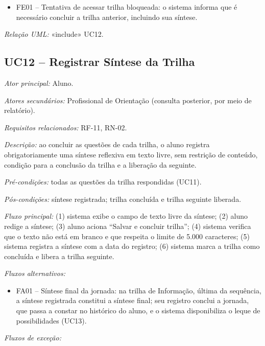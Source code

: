 \begin{itemize}[label={},leftmargin=\parindent,itemsep=0pt,topsep=0pt]
  \item FE01 – Tentativa de acessar trilha bloqueada: o sistema informa que é necessário concluir a trilha anterior, incluindo sua síntese.
\end{itemize}

\textit{Relação UML:} «include» UC12.

\subsection*{UC12 -- Registrar Síntese da Trilha}\label{uc:uc12}

\textit{Ator principal:} Aluno.

\textit{Atores secundários:} Profissional de Orientação (consulta posterior, por meio de relatório).

\textit{Requisitos relacionados:} RF-11, RN-02.

\textit{Descrição:} ao concluir as questões de cada trilha, o aluno registra obrigatoriamente uma síntese reflexiva em texto livre, sem restrição de conteúdo, condição para a conclusão da trilha e a liberação da seguinte.

\textit{Pré-condições:} todas as questões da trilha respondidas (UC11).

\textit{Pós-condições:} síntese registrada; trilha concluída e trilha seguinte liberada.

\textit{Fluxo principal:} (1) sistema exibe o campo de texto livre da síntese; (2) aluno redige a síntese; (3) aluno aciona ``Salvar e concluir trilha''; (4) sistema verifica que o texto não está em branco e que respeita o limite de 5.000 caracteres; (5) sistema registra a síntese com a data do registro; (6) sistema marca a trilha como concluída e libera a trilha seguinte.

\textit{Fluxos alternativos:}

\begin{itemize}[label={},leftmargin=\parindent,itemsep=0pt,topsep=0pt]
  \item FA01 – Síntese final da jornada: na trilha de Informação, última da sequência, a síntese registrada constitui a síntese final; seu registro conclui a jornada, que passa a constar no histórico do aluno, e o sistema disponibiliza o leque de possibilidades (UC13).
\end{itemize}

\textit{Fluxos de exceção:}

